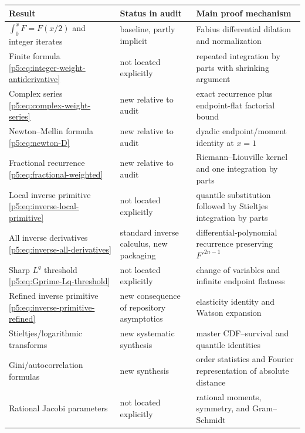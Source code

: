 \documentclass[11pt,oneside]{article}
\theoremstyle{definition}
\theoremstyle{remark}
\newcommand{\1}{\mathbf 1}
\begin{document}
\begin{longtable}{@{}p{}p{}p{}@{}}
\toprule
Result & Status in audit & Main proof mechanism\\
\midrule
\endhead
$\int_0^xF=F(x/2)$ and integer iterates
& baseline, partly implicit
& Fabius differential dilation and normalization\\
\addlinespace
Finite formula \eqref{p5:eq:integer-weight-antiderivative}
& not located explicitly
& repeated integration by parts with shrinking argument\\
\addlinespace
Complex series \eqref{p5:eq:complex-weight-series}
& new relative to audit
& exact recurrence plus endpoint-flat factorial bound\\
\addlinespace
Newton--Mellin formula \eqref{p5:eq:newton-D}
& new relative to audit
& dyadic endpoint/moment identity at $x=1$\\
\addlinespace
Fractional recurrence \eqref{p5:eq:fractional-weighted}
& new relative to audit
& Riemann--Liouville kernel and one integration by parts\\
\addlinespace
Local inverse primitive \eqref{p5:eq:inverse-local-primitive}
& not located explicitly
& quantile substitution followed by Stieltjes integration by parts\\
\addlinespace
All inverse derivatives \eqref{p5:eq:inverse-all-derivatives}
& standard inverse calculus, new packaging
& differential-polynomial recurrence preserving $F'^{2n-1}$\\
\addlinespace
Sharp $L^q$ threshold \eqref{p5:eq:Gprime-Lq-threshold}
& not located explicitly
& change of variables and infinite endpoint flatness\\
\addlinespace
Refined inverse primitive \eqref{p5:eq:inverse-primitive-refined}
& new consequence of repository asymptotics
& elasticity identity and Watson expansion\\
\addlinespace
Stieltjes/logarithmic transforms
& new systematic synthesis
& master CDF--survival and quantile identities\\
\addlinespace
Gini/autocorrelation formulas
& new synthesis
& order statistics and Fourier representation of absolute distance\\
\addlinespace
Rational Jacobi parameters
& not located explicitly
& rational moments, symmetry, and Gram--Schmidt\\
\bottomrule
\end{longtable}
\end{document}
